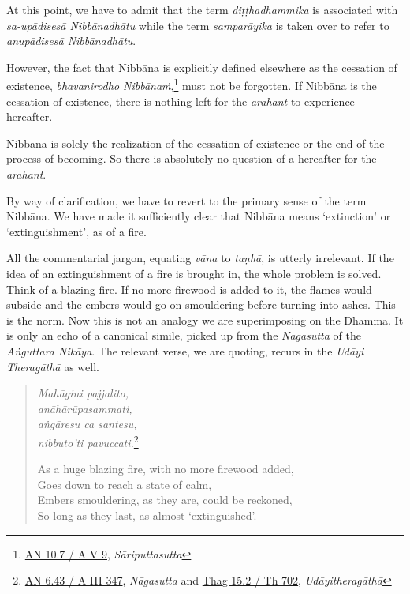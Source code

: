 At this point, we have to admit that the term \emph{diṭṭhadhammika} is associated with \emph{sa-upādisesā Nibbānadhātu} while the term \emph{samparāyika} is taken over to refer to \emph{anupādisesā Nibbānadhātu}.

However, the fact that Nibbāna is explicitly defined elsewhere as the cessation of existence, \emph{bhavanirodho Nibbānaṁ},\footnote{\href{https://suttacentral.net/an10.7/pli/ms}{AN 10.7 / A V 9}, \emph{Sāriputtasutta}} must not be forgotten. If Nibbāna is the cessation of existence, there is nothing left for the \emph{arahant} to experience hereafter.

Nibbāna is solely the realization of the cessation of existence or the end of the process of becoming. So there is absolutely no question of a hereafter for the \emph{arahant}.

By way of clarification, we have to revert to the primary sense of the term Nibbāna. We have made it sufficiently clear that Nibbāna means `extinction' or `extinguishment', as of a fire.

All the commentarial jargon, equating \emph{vāna} to \emph{taṇhā}, is utterly irrelevant. If the idea of an extinguishment of a fire is brought in, the whole problem is solved. Think of a blazing fire. If no more firewood is added to it, the flames would subside and the embers would go on smouldering before turning into ashes. This is the norm. Now this is not an analogy we are superimposing on the Dhamma. It is only an echo of a canonical simile, picked up from the \emph{Nāgasutta} of the \emph{Aṅguttara Nikāya}. The relevant verse, we are quoting, recurs in the \emph{Udāyi Theragāthā} as well.

\begin{quote}
\emph{Mahāgini pajjalito,}\\
\emph{anāhārūpasammati,}\\
\emph{aṅgāresu ca santesu,}\\
\emph{nibbuto'ti pavuccati.}\footnote{\href{https://suttacentral.net/an6.43/pli/ms}{AN 6.43 / A III 347}, \emph{Nāgasutta} and \href{https://suttacentral.net/thag15.2/pli/ms}{Thag 15.2 / Th 702}, \emph{Udāyitheragāthā}}

As a huge blazing fire, with no more firewood added,\\
Goes down to reach a state of calm,\\
Embers smouldering, as they are, could be reckoned,\\
So long as they last, as almost `extinguished'.
\end{quote}

